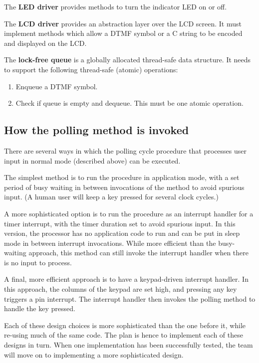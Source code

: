 \documentclass[11pt,a4paper
]{scrartcl}
\begin{document}
The \textbf{LED driver} provides methods to turn the indicator LED on or off.

The \textbf{LCD driver} provides an abstraction layer over the LCD screen. It must implement methods which allow a DTMF symbol or a C string to be encoded and
displayed on the LCD.

The \textbf{lock-free queue} is a globally allocated thread-safe data structure. It needs to support the following thread-safe (atomic) operations:
\begin{enumerate}
   \item Enqueue a DTMF symbol.
   \item Check if queue is empty and dequeue. This must be one atomic operation.
\end{enumerate}

\subsection{How the polling method is invoked}

There are several ways in which the polling cycle procedure that processes user input in normal mode (described above) can be executed.

The simplest method is to run the procedure in application mode, with a set period of busy waiting in between invocations of the method to avoid spurious input.
(A human user will keep a key pressed for several clock cycles.)

A more sophisticated option is to run the procedure as an interrupt handler for a timer interrupt, with the timer duration set to avoid spurious input. In this
version, the processor has no application code to run and can be put in sleep mode in between interrupt invocations. While more efficient than the busy-waiting
approach, this method can still invoke the interrupt handler when there is no input to process.

A final, more efficient approach is to have a keypad-driven interrupt handler. In this approach, the columns of the keypad are set high, and pressing any key
triggers a pin interrupt. The interrupt handler then invokes the polling method to handle the key pressed.

Each of these design choices is more sophisticated than the one before it, while re-using much of the same code. 
The plan is hence to implement each of these designs in turn. When one implementation has been successfully tested, the team will move on to implementing a more
sophisticated design.
\end{document}
